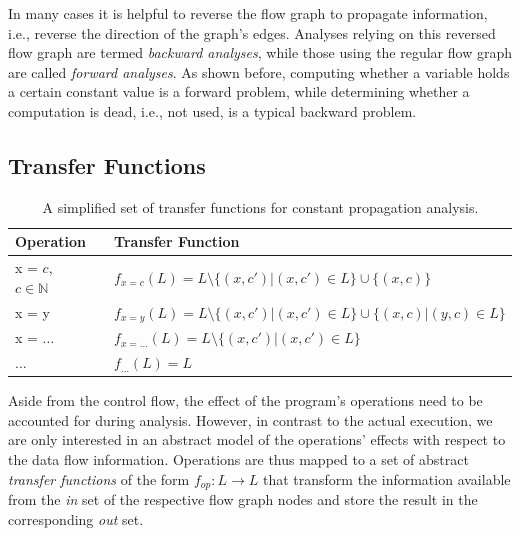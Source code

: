 In many cases it is helpful to reverse the flow graph to propagate information,
i.e., reverse the direction of the graph's edges. Analyses relying on this
reversed flow graph are termed \emph{backward analyses}, while those using the
regular flow graph are called \emph{forward analyses}. As shown before,
computing whether a variable holds a certain constant value is a forward
problem, while determining whether a computation is dead, i.e., not used, is a
typical backward problem.

\subsection{Transfer Functions}

\begin{table}[b]
  \begin{center}
    \begin{tabular}{lp{8mm}l}
      Operation                   & & Transfer Function                      \\ \hline
      x = $c$, $c \in \mathbb{N}$ & & $f_{x=c}(L) = L \setminus \{ (x, c') | (x, c') \in L \} \cup \{ (x, c) \}$ \\
      x = y                       & & $f_{x=y}(L) = L \setminus \{ (x, c') | (x, c') \in L \} \cup \{ (x, c) | (y,c) \in L\}$ \\
      x = $\ldots$                & & $f_{x=\ldots}(L) = L \setminus \{ (x, c') | (x, c') \in L \}$ \\
      $\ldots$                    & & $f_{\ldots}(L) = L$ \\ \hline
    \end{tabular}
  \end{center}
  \caption{A simplified set of transfer functions for constant propagation
           analysis.}
  \label{novillo:fig:transfer_functions}
\end{table}

Aside from the control flow, the effect of the program's operations
need to be accounted for during analysis. However, in contrast to the actual
execution, we are only interested in an abstract model of the operations'
effects with respect to the data flow information. Operations are thus mapped to
a set of abstract \emph{transfer functions} of the form $f_{op}\colon L \rightarrow
L$ that transform the information available from the \emph{in} set of the
respective flow graph nodes and store the result in the corresponding \emph{out}
set.

